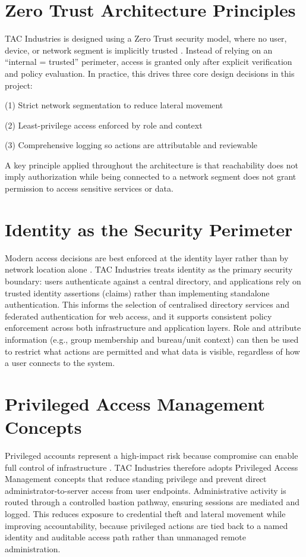 \raggedright
\section{Zero Trust Architecture Principles}

TAC Industries is designed using a Zero Trust security model, where no user, device, or
network segment is implicitly trusted \cite{nist800207}. Instead of relying on an “internal = trusted” perimeter,
access is granted only after explicit verification and policy evaluation. In practice, this drives
three core design decisions in this project: 

(1) Strict network segmentation to reduce lateral movement

(2) Least-privilege access enforced by role and context

(3) Comprehensive logging so actions are attributable and reviewable

A key principle applied throughout the architecture is that reachability does not imply authorization while being connected to a network segment does not grant permission to access sensitive services or data.

\section{Identity as the Security Perimeter}

Modern access decisions are best enforced at the identity layer rather than by network
location alone \cite{nist800207}. TAC Industries treats identity as the primary security boundary: users
authenticate against a central directory, and applications rely on trusted identity assertions
(claims) rather than implementing standalone authentication. This informs the selection of
centralised directory services and federated authentication for web access, and it supports
consistent policy enforcement across both infrastructure and application layers. Role and
attribute information (e.g., group membership and bureau/unit context) can then be used to
restrict what actions are permitted and what data is visible, regardless of how a user connects
to the system.

\section{Privileged Access Management Concepts}

Privileged accounts represent a high-impact risk because compromise can enable full control
of infrastructure \cite{nist800207}. TAC Industries therefore adopts Privileged Access Management concepts
that reduce standing privilege and prevent direct administrator-to-server access from user
endpoints. Administrative activity is routed through a controlled bastion pathway, ensuring
sessions are mediated and logged. This reduces exposure to credential theft and lateral
movement while improving accountability, because privileged actions are tied back to a
named identity and auditable access path rather than unmanaged remote administration.
